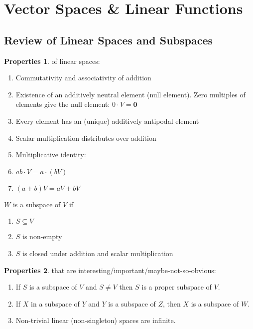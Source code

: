 \documentclass{article}
\theoremstyle{definition}
\newtheorem{prop}{Properties}[section]
\begin{document}
\newpage
\section{Vector Spaces \& Linear Functions}
\subsection{Review of Linear Spaces and Subspaces}
\begin{prop} of linear spaces:
\begin{enumerate}
	\item Commutativity and associativity of addition
	\item Existence of an additively neutral element (null element). Zero multiples of elements give the null element: $0\cdot V = \mathbf{0}$\\
	\item Every element has an (unique) additively antipodal element
	\item Scalar multiplication distributes over addition
	\item Multiplicative identity: 
	\item $ab\cdot V = a\cdot(bV)$
	\item $(a+b)V = aV + bV$
\end{enumerate}
\end{prop}
$W$ is a subspace of $V$ if
\begin{enumerate}
	\item $S \subseteq V$ 
	\item $S$ is non-empty
	\item $S$ is closed under addition and scalar multiplication
\end{enumerate}
\begin{prop} that are interesting/important/maybe-not-so-obvious:
\begin{enumerate}
	\item If $S$ is a subspace of $V$ and $S \neq V$ then $S$ is a proper subspace of $V$.
	\item If $X$ in a subspace of $Y$ and $Y$ is a subspace of $Z$, then $X$ is a subspace of $W$.
	\item Non-trivial linear (non-singleton) spaces are infinite. 
\end{enumerate}
\end{prop}
\end{document}
